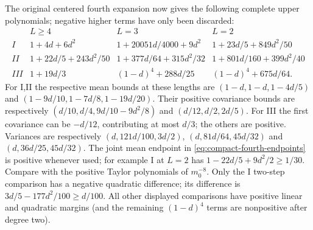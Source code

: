 The original centered fourth expansion now gives the following complete
upper polynomials; negative higher terms have only been discarded:
\[
\begin{array}{c|ccc}
 & L\ge4&L=3&L=2\\\hline
I&1+4d+6d^2&1+20051d/4000+9d^2&1+23d/5+849d^2/50\\
II&1+22d/5+243d^2/50&1+377d/64+315d^2/32&1+801d/160+399d^2/40\\
III&1+19d/3&(1-d)^4+288d/25&(1-d)^4+675d/64.
\end{array}
\]
For I,II the respective mean bounds at these lengths are
$(1-d,1-d,1-4d/5)$ and $(1-9d/10,1-7d/8,1-19d/20)$.
Their positive covariance bounds are respectively
$(d/10,d/4,9d/10-9d^2/8)$ and $(d/12,d/2,2d/5)$.
For III the first covariance can be $-d/12$, contributing at most $d/3$;
the others are positive. Variances are respectively
$(d,121d/100,3d/2)$, $(d,81d/64,45d/32)$ and
$(d,36d/25,45d/32)$.
The joint mean endpoint in \eqref{eq:compact-fourth-endpoints} is positive
whenever used; for example I at $L=2$ has
$1-22d/5+9d^2/2\ge1/30$.
Compare with the positive Taylor polynomials of $m_0^{-8}$.
Only the I two-step comparison has a negative quadratic difference;
its difference is $3d/5-177d^2/100\ge d/100$.
All other displayed comparisons have positive linear and quadratic
margins (and the remaining $(1-d)^4$ terms are nonpositive after degree two).

